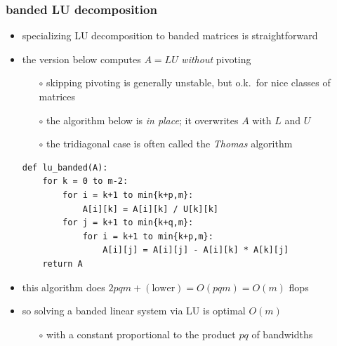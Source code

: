 \documentclass[10pt,
               svgnames,
               hyperref={colorlinks,citecolor=DeepPink4,linkcolor=FireBrick,urlcolor=Maroon},
               usepdftitle=false]{beamer}
\begin{document}
\begin{frame}[fragile]
\frametitle{banded LU decomposition}

\begin{itemize}
\item specializing LU decomposition to banded matrices is straightforward
\item the version below computes $A=LU$ \emph{without} pivoting
   \begin{itemize}
   \item[$\circ$] skipping pivoting is generally unstable, but o.k.~for nice classes of matrices 
   \item[$\circ$] the algorithm below is \emph{in place}; it overwrites $A$ with $L$ and $U$
   \item[$\circ$] the tridiagonal case is often called the \emph{Thomas} algorithm
   \end{itemize}

\medskip
\begin{center}
\begin{minipage}{0.8\textwidth}
\begin{verbatim}
def lu_banded(A):
    for k = 0 to m-2:
        for i = k+1 to min{k+p,m}:
            A[i][k] = A[i][k] / U[k][k]
        for j = k+1 to min{k+q,m}:
            for i = k+1 to min{k+p,m}:
                A[i][j] = A[i][j] - A[i][k] * A[k][j]
    return A
\end{verbatim}
\end{minipage}
\end{center}

\bigskip
\item this algorithm does $2pqm + (\text{lower}) = O(pqm) = O(m)$ flops
\item so solving a banded linear system via LU is optimal $O(m)$
   \begin{itemize}
   \item[$\circ$] with a constant proportional to the product $pq$ of bandwidths
   \end{itemize}
\end{itemize}
\end{frame}
\end{document}
